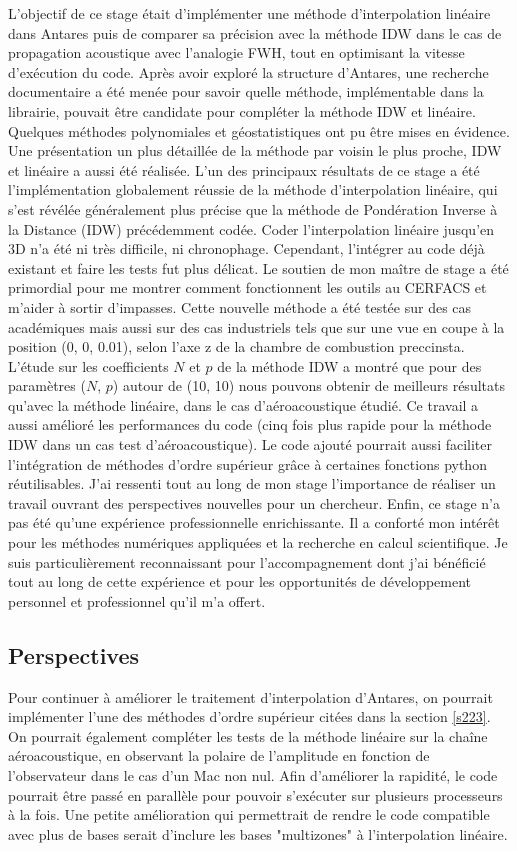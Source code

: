 L'objectif de ce stage était d'implémenter une méthode d'interpolation linéaire dans Antares puis de comparer sa précision avec la méthode IDW dans le cas de propagation acoustique avec l'analogie FWH, tout en optimisant la vitesse d'exécution du code.
Après avoir exploré la structure d'Antares, une recherche documentaire a été menée pour savoir quelle méthode, implémentable dans la librairie, pouvait être candidate pour compléter la méthode IDW et linéaire. Quelques méthodes polynomiales et géostatistiques ont pu être mises en évidence. Une présentation un plus détaillée de la méthode par voisin le plus proche, IDW et linéaire a aussi été réalisée.
L'un des principaux résultats de ce stage a été l'implémentation globalement réussie de la méthode d'interpolation linéaire, qui s'est révélée  généralement plus précise que la méthode de Pondération Inverse à la Distance (IDW) précédemment codée.
Coder l’interpolation linéaire jusqu’en 3D n’a été ni très difficile, ni chronophage. Cependant, l’intégrer au code déjà existant et faire les tests fut plus délicat. Le soutien de mon maître de stage a été primordial pour me montrer comment fonctionnent les outils au CERFACS et m'aider à sortir d'impasses.
Cette nouvelle méthode a été testée sur des cas académiques mais aussi sur des cas industriels tels que sur une vue en coupe à la position (0, 0, 0.01), selon l'axe z de la chambre de combustion preccinsta.
L'étude sur les coefficients \(N\) et \(p\) de la méthode IDW a montré que pour des paramètres (\(N\), \(p\)) autour de (10, 10) nous pouvons obtenir de meilleurs résultats qu'avec la méthode linéaire, dans le cas d'aéroacoustique étudié.
Ce travail a aussi amélioré les performances du code (cinq fois plus rapide pour la méthode IDW dans un cas test d'aéroacoustique).
Le code ajouté pourrait aussi faciliter l'intégration de méthodes d'ordre supérieur grâce à certaines fonctions python réutilisables.
J'ai ressenti tout au long de mon stage l'importance de réaliser un travail ouvrant des perspectives nouvelles pour un chercheur.
Enfin, ce stage n'a pas été qu'une expérience professionnelle enrichissante. Il a conforté mon intérêt pour les méthodes numériques appliquées et la recherche en calcul scientifique. Je suis particulièrement reconnaissant pour l'accompagnement dont j'ai bénéficié tout au long de cette expérience et pour les opportunités de développement personnel et professionnel qu'il m'a offert.

\subsection*{Perspectives}
Pour continuer à améliorer le traitement d'interpolation d'Antares, on pourrait implémenter l'une des méthodes d'ordre supérieur citées dans la section \ref{s223}.
On pourrait également compléter les tests de la méthode linéaire sur la chaîne aéroacoustique, en observant la polaire de l'amplitude en fonction de l'observateur dans le cas d'un Mac non nul.
Afin d'améliorer la rapidité, le code pourrait être passé en parallèle pour pouvoir s’exécuter sur plusieurs processeurs à la fois.
Une petite amélioration qui permettrait de rendre le code compatible avec plus de bases serait d'inclure les bases "multizones" à l'interpolation linéaire.


